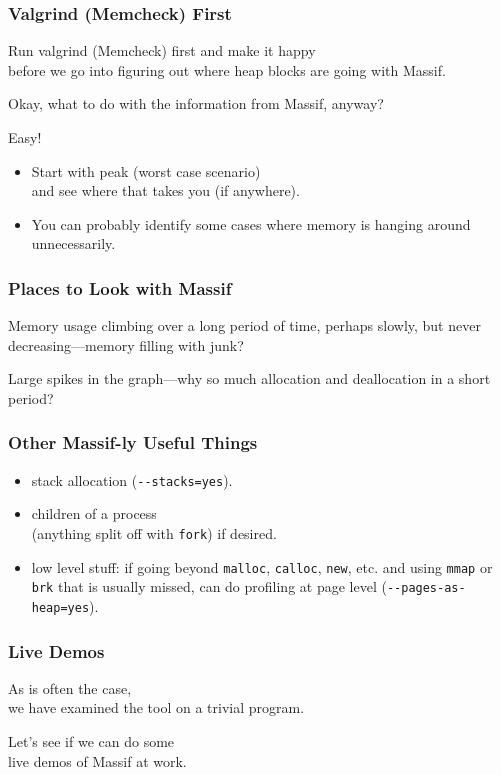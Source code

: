 \begin{frame}
\frametitle{Valgrind (Memcheck) First}


Run valgrind (Memcheck) first and make it happy \\
before we go into figuring out where heap blocks are going with Massif. 

Okay, what to do with the information from Massif, anyway? 

Easy!
\begin{itemize}
\item Start with peak (worst case scenario) \\ and see where that takes you (if anywhere). 

\item You can probably identify some cases where memory is hanging around unnecessarily. 
\end{itemize}



\end{frame}


\begin{frame}
\frametitle{Places to Look with Massif}

\large
Memory usage climbing over a long period of time, perhaps slowly, but never decreasing---memory filling with junk? 

Large spikes in the graph---why so much allocation and deallocation in a short period?
\end{frame}



\begin{frame}[fragile]
\frametitle{Other Massif-ly Useful Things}

\large
\begin{itemize}
	\item stack allocation (\verb+--stacks=yes+).
	\item children of a process \\ (anything split off with \texttt{fork}) if desired.
	\item low level stuff: if going beyond \texttt{malloc}, \texttt{calloc}, \texttt{new}, etc. and using \texttt{mmap} or \texttt{brk} that is usually missed, can do profiling at page level (\verb+--pages-as-heap=yes+).
\end{itemize}

\end{frame}




\begin{frame}
\frametitle{Live Demos}

\large

As is often the case, \\ we have examined the tool on a trivial program. 

Let's see if we can do some\\
 live demos of Massif at work.

\end{frame}





